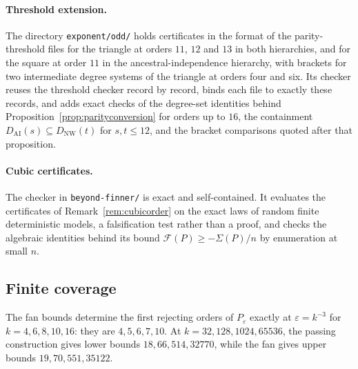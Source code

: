 \documentclass[11pt]{article}
\theoremstyle{plain}
\theoremstyle{definition}
\newcommand{\eps}{\varepsilon}
\begin{document}
\paragraph{Threshold extension.}
The directory \texttt{exponent/odd/} holds certificates in the format of the parity-threshold files for the triangle at orders $11$, $12$ and $13$ in both hierarchies, and for the square at order $11$ in the ancestral-independence hierarchy, with brackets for two intermediate degree systems of the triangle at orders four and six. Its checker reuses the threshold checker record by record, binds each file to exactly these records, and adds exact checks of the degree-set identities behind Proposition~\ref{prop:parityconversion} for orders up to $16$, the containment $D_{\mathrm{AI}}(s)\subseteq D_{\mathrm{NW}}(t)$ for $s,t\le12$, and the bracket comparisons quoted after that proposition.

\paragraph{Cubic certificates.}
The checker in \texttt{beyond-finner/} is exact and self-contained. It evaluates the certificates of Remark~\ref{rem:cubicorder} on the exact laws of random finite deterministic models, a falsification test rather than a proof, and checks the algebraic identities behind its bound $\mathcal F(P)\ge-\Sigma(P)/n$ by enumeration at small $n$.

\subsection{Finite coverage}

The fan bounds determine the first rejecting orders of $P_\eps$ exactly at $\eps=k^{-3}$ for $k=4,6,8,10,16$: they are $4,5,6,7,10$. At $k=32,128,1024,65536$, the passing construction gives lower bounds $18,66,514,32770$, while the fan gives upper bounds $19,70,551,35122$.
\end{document}
